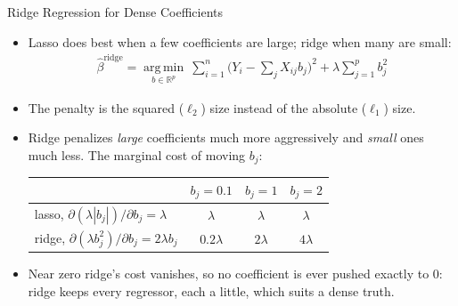 \documentclass[aspectratio=169,11pt,xcolor=dvipsnames]{beamer}
\DeclareMathOperator*{\argminop}{arg\,min}
\newcommand{\argmin}{\argminop\limits}
\newcommand{\R}{\mathbb{R}}
\newcommand{\core}{\,\raisebox{0.6pt}{\textcolor{corestar}{$\bigstar$}}}
\begin{document}
\begin{frame}{Ridge Regression for Dense Coefficients\core}
\begin{itemize}\itemsep4pt
  \item Lasso does best when a few coefficients are large; ridge when many are small:
  \begin{align*}
    \hat\beta^{\text{ridge}} = \argmin_{b\in\R^{p}}\ \sum_{i=1}^n\big(Y_i - \textstyle\sum_{j} X_{ij} b_j\big)^2
    + \lambda \sum_{j=1}^{p} b_j^2
  \end{align*}
  \item The penalty is the squared ($\ell_2$) size instead of the absolute ($\ell_1$) size.
  \item Ridge penalizes \emph{large} coefficients much more aggressively and
        \emph{small} ones much less. The marginal cost of moving $b_j$:
  \begin{center}\small
  \begin{tabular}{@{}lccc@{}}
  \toprule
  & $b_j = 0.1$ & $b_j = 1$ & $b_j = 2$ \\
  \midrule
  lasso, $\partial(\lambda|b_j|)/\partial b_j = \lambda$ & $\lambda$ & $\lambda$ & $\lambda$ \\
  ridge, $\partial(\lambda b_j^2)/\partial b_j = 2\lambda b_j$ & $0.2\lambda$ & $2\lambda$ & $4\lambda$ \\
  \bottomrule
  \end{tabular}
  \end{center}
  \item Near zero ridge's cost vanishes, so no coefficient is ever pushed exactly to
        0: ridge keeps every regressor, each a little, which suits a dense truth.
\end{itemize}
\end{frame}
\end{document}
